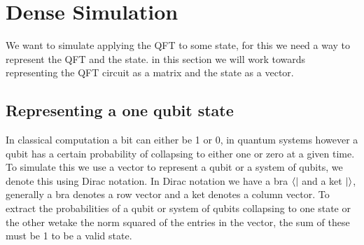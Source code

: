\section{Dense Simulation}\label{sec:dense}
We want to simulate applying the QFT to some state, for this we need a way to represent the QFT and the state. 
in this section we will work towards representing the QFT circuit as a matrix and the state as a vector. 
\subsection{Representing a one qubit state}
In classical computation a bit can either be 1 or 0, in quantum systems however a qubit has a certain probability of collapsing to either one or zero at a given time.
To simulate this we use a vector to represent a qubit or a system of qubits, we denote this using Dirac notation. In Dirac notation we have a bra $\bra{}$ and a ket $\ket{}$, generally a bra denotes a row vector and a ket denotes a column vector.
To extract the probabilities of a qubit or system of qubits collapsing to one state or the other wetake the norm squared of the entries in the vector, the sum of these must be 1 to be a valid state.
\newcommand{\qo}{\begin{bmatrix}
        0\\
        1\\
    \end{bmatrix}}
\newcommand{\qz}{\begin{bmatrix}
        1\\
        0\\
    \end{bmatrix}}
\newcommand{\qp}{\begin{bmatrix}
        \sqrt{0.5}\\
        \sqrt{0.5}\\
    \end{bmatrix}}
\newcommand{\qm}{\begin{bmatrix}
        \sqrt{0.5}\\
        -\sqrt{0.5}\\
    \end{bmatrix}}
    
